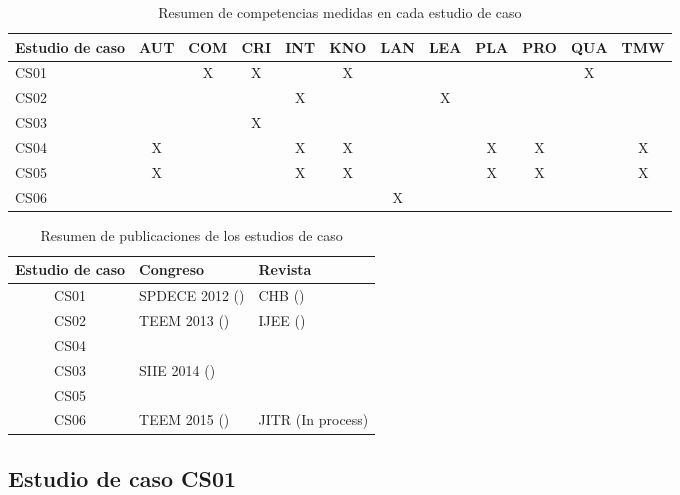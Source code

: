 \begin{table}
	\centering
	\caption{Resumen de competencias medidas en cada estudio de caso}
	\label{tab:ResumenHerramientasCompetenciasCS}
	\setlength\tabcolsep{2.5pt}
	\begin{tabular}{|L{1.3cm}|c|c|c|c|c|c|c|c|c|c|c|}
		\hline
		Estudio de caso & AUT & COM & CRI & INT & KNO & LAN & LEA & PLA & PRO & QUA & TMW \\
		\hline
		\hline
		CS01 & & X & X & & X & & & & & X & \\
		\hline
		CS02 & &  &  & X &  & & X & & &  & \\
		\hline
		CS03 & &  & X &  &  & &  & & &  & \\
		\hline
		CS04 & X &  &  & X & X  & &  & X &  X &  & X \\
		\hline
		CS05 & X &  &  & X & X  & &  & X &  X &  & X  \\
		\hline
		CS06 & &  &  &  &  & X &  & & &  & \ \\
		\hline
	\end{tabular}
\end{table}

\begin{table}
	\centering
	\caption{Resumen de publicaciones de los estudios de caso}
	\label{tab:ResumenCS}
	\begin{tabular}{|c|l|l|}
		\hline
		Estudio de caso & Congreso & Revista \\
		\hline
		\hline
		CS01 & SPDECE 2012 (\cite{Balderas:2012}) & CHB (\cite{palomo2014scalability})  \\
		\hline
		CS02 & \multirow{2}{*}{TEEM 2013 (\cite{balderas2013generative})} & \multirow{4}{*}{IJEE (\cite{Balderas:2015})}  \\
		\cline{1-1}
		CS04 &    &  \\
		\cline{1-2}
		CS03 & \multirow{2}{*}{SIIE 2014 (\cite{balderas2014domain})}   &  \\
		\cline{1-1}
		CS05 &   &   \\
		\hline
		CS06 & TEEM 2015 (\cite{balderas2015domain}) & JITR (In process) \\
		\hline
	\end{tabular}
\end{table}

	\subsection{Estudio de caso CS01}

